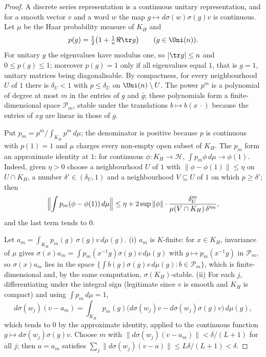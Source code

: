\begin{proof}
A discrete series representation is a continuous unitary representation, and for a smooth vector $v$ and a word $w$ the map
$g\mapsto d\sigma(w)\sigma(g)v$ is continuous. Let $\mu$ be the Haar probability measure of $K_H$ and
\[
p(g)=\tfrac12\bigl(1+\tfrac1n\Re\tr g\bigr)\qquad(g\in\Uni(n)).
\]
For unitary $g$ the eigenvalues have modulus one, so $|\tr g|\le n$ and $0\le p(g)\le1$; moreover $p(g)=1$ only if all
eigenvalues equal $1$, that is $g=1$, unitary matrices being diagonalisable. By compactness, for every neighbourhood $U$ of
$1$ there is $\delta_U<1$ with $p\le\delta_U$ on $\Uni(n)\setminus U$. The power $p^m$ is a polynomial of degree at most $m$ in
the entries of $g$ and $\bar g$; these polynomials form a finite-dimensional space $\mathcal P_m$, stable under the
translations $b\mapsto b(x\,\cdot)$ because the entries of $xg$ are linear in those of $g$.

Put $p_m=p^m/\int_{K_H}p^m\,d\mu$; the denominator is positive because $p$ is continuous with $p(1)=1$ and $\mu$ charges every
non-empty open subset of $K_H$. The $p_m$ form an approximate identity at $1$: for continuous $\phi\colon K_H\to\mathcal H$,
$\int p_m\phi\,d\mu\to\phi(1)$. Indeed, given $\eta>0$ choose a neighbourhood $U$ of $1$ with $\|\phi-\phi(1)\|\le\eta$ on
$U\cap K_H$, a number $\delta'\in(\delta_U,1)$ and a neighbourhood $V\subseteq U$ of $1$ on which $p\ge\delta'$; then
\[
\Bigl\|\int p_m(\phi-\phi(1))\,d\mu\Bigr\|\le\eta+2\sup\|\phi\|\cdot\frac{\delta_U^m}{\mu(V\cap K_H)\,\delta'^m},
\]
and the last term tends to $0$.

Let $a_m=\int_{K_H}p_m(g)\,\sigma(g)v\,d\mu(g)$. (i) $a_m$ is $K$-finite: for $x\in K_H$, invariance of $\mu$ gives
$\sigma(x)a_m=\int p_m(x^{-1}g)\sigma(g)v\,d\mu(g)$ with $g\mapsto p_m(x^{-1}g)$ in $\mathcal P_m$, so $\sigma(x)a_m$ lies in the
space $\{\int b(g)\sigma(g)v\,d\mu(g):b\in\mathcal P_m\}$, which is finite-dimensional and, by the same computation,
$\sigma(K_H)$-stable. (ii) For each $j$, differentiating under the integral sign (legitimate since $v$ is smooth and $K_H$ is
compact) and using $\int p_m\,d\mu=1$,
\[
d\sigma(w_j)(v-a_m)=\int_{K_H}p_m(g)\bigl(d\sigma(w_j)v-d\sigma(w_j)\sigma(g)v\bigr)\,d\mu(g),
\]
which tends to $0$ by the approximate identity, applied to the continuous function $g\mapsto d\sigma(w_j)\sigma(g)v$. Choose $m$
with $\|d\sigma(w_j)(v-a_m)\|<\delta/(L+1)$ for all $j$; then $a=a_m$ satisfies
$\sum_j\|d\sigma(w_j)(v-a)\|\le L\delta/(L+1)<\delta$.
\end{proof}

